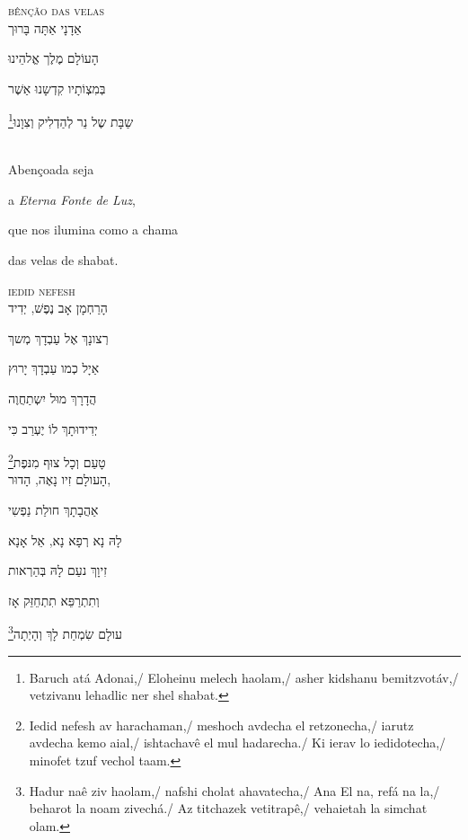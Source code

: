 \textsc{bênção das velas}\\[15pt]

אַדָנָי אַתָּה בָּרוּך

הָעוֹלָם מֶלֶך אֱלהֵינוּ

בְּמִצְוֹתָיו קִדְשָנוּ אַשֶׁר

שַבָּת שֶל נֵר לְהַדְלִיק וְצִוָנוּ‏\footnote{Baruch atá Adonai,/ Eloheinu melech haolam,/ asher kidshanu bemitzvotáv,/ vetzivanu lehadlic ner shel shabat.}

\movetooddpage
\raggedright

\vspace*{1cm}

\textsc{}\\[15pt]

Abençoada seja

a \emph{Eterna Fonte de Luz}, 

que nos ilumina como a chama

das velas de shabat. 


\movetoevenpage
\raggedleft

\vspace*{1cm}

\textsc{iedid nefesh}\\[15pt]

הָרַחְמָן אָב נֶפֶשׁ, יְדִיד 

רְצונָךְ אֶל עַבְדָךְ מְשךְ 

אַיָל כְמו עַבְדָךְ יָרוּץ 

הֲדָרָךְ מוּל יִשְתַחֲוֶה 

יְדִידוּתָךְ לוֹ יֶעְרַב כִּי 

טָעַם וְכָל צוּף מִנּפֶת\footnote{Iedid nefesh av harachaman,/ meshoch avdecha el retzonecha,/ iarutz avdecha kemo aial,/ ishtachavê el mul hadarecha./ Ki ierav lo iedidotecha,/ minofet tzuf vechol taam.}\\[10pt]

הָעולָם זִיו נָאֶה, הָדוּר,

אַהֲבָתָךְ חולַת נַפְשִי 

לָהּ נָא רְפָא נָא, אֵל אָנָא 

זִיוָךְ נעַם לָהּ בְּהַרְאות

וְתִתְרַפֵּא תִתְחֵזֵּק אָז

עולָם שִׂמְחַת לָךְ וְהָיְתָה\footnote{Hadur naê ziv haolam,/ nafshi cholat ahavatecha,/ Ana El na, refá na la,/ beharot la noam zivechá./ Az titchazek vetitrapê,/ vehaietah la simchat olam.}\\[10pt]


